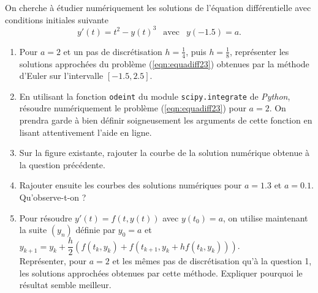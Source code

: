 \begin{exercice}
On cherche à étudier numériquement les solutions de l'équation différentielle avec conditions initiales suivante 
\begin{equation}
y'(t)=t^2-y(t)^3~~\text{ avec }~~y(-1.5)=a. \label{eqn:equadiff23}
\end{equation}
\begin{enumerate}
\item Pour $a=2$ et un pas de discrétisation $h=\frac{1}{4}$, puis $h=\frac{1}{8}$, représenter les solutions approchées du problème (\ref{eqn:equadiff23}) obtenues par la méthode d'Euler sur l'intervalle $[-1.5,2.5]$.
\item En utilisant la fonction \texttt{odeint} du module \texttt{scipy.integrate} de \textit{Python}, résoudre numériquement le problème (\ref{eqn:equadiff23}) pour $a=2$. On prendra garde à bien définir soigneusement les arguments de cette fonction en lisant attentivement l'aide en ligne.
\item Sur la figure existante, rajouter la courbe de la solution numérique obtenue à la question précédente.
\item Rajouter ensuite les courbes des solutions  numériques pour $a=1.3$ et $a=0.1$. Qu'observe-t-on ?
\item Pour résoudre $y'(t)=f(t,y(t))$ avec $y(t_0)=a$, on utilise maintenant la suite $(y_n)$ définie par $y_0=a$ et $y_{k+1}=y_k+\dfrac{h}{2}\left( f(t_k,y_k)+f(t_{k+1},y_k+hf(t_k,y_k))\right)$. \\
Représenter, pour $a=2$ et les mêmes pas de discrétisation qu'à la question 1, les solutions approchées obtenues par cette méthode. Expliquer pourquoi le résultat semble meilleur.
\end{enumerate}
\end{exercice}


